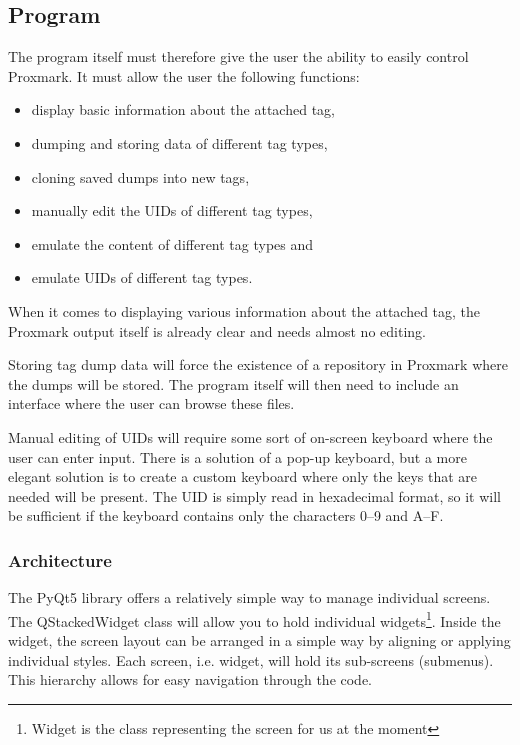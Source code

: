 \subsection{Program}

The program itself must therefore give the user the ability to easily control Proxmark. It must allow the user the following functions:

\begin{itemize}
    \item display basic information about the attached tag,
    \item dumping and storing data of different tag types,
    \item cloning saved dumps into new tags,
    \item manually edit the UIDs of different tag types,
    \item emulate the content of different tag types and
    \item emulate UIDs of different tag types.
\end{itemize}

When it comes to displaying various information about the attached tag, the Proxmark output itself is already clear and needs almost no editing.

Storing tag dump data will force the existence of a repository in Proxmark where the dumps will be stored. The program itself will then need to include an interface where the user can browse these files.

Manual editing of UIDs will require some sort of on-screen keyboard where the user can enter input. There is a solution of a pop-up keyboard, but a more elegant solution is to create a custom keyboard where only the keys that are needed will be present. The UID is simply read in hexadecimal format, so it will be sufficient if the keyboard contains only the characters 0--9 and A--F.

\subsubsection{Architecture}

The PyQt5 library offers a relatively simple way to manage individual screens. The QStackedWidget class will allow you to hold individual widgets\footnote{Widget is the class representing the screen for us at the moment}. Inside the widget, the screen layout can be arranged in a simple way by aligning or applying individual styles. Each screen, i.e. widget, will hold its sub-screens (submenus). This hierarchy allows for easy navigation through the code.

